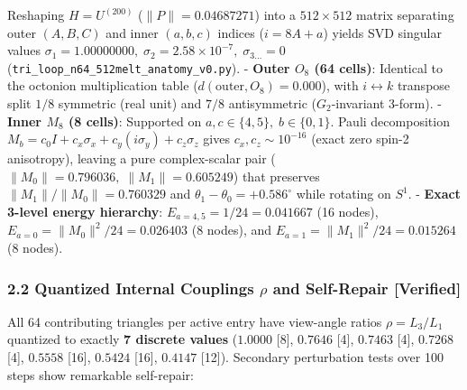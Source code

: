 \documentclass[
  a4paper,
]{article}
\begin{document}
Reshaping \(H = U^{(200)}\) (\(\|P\| = 0.04687271\)) into a
\(512\times 512\) matrix separating outer \((A,B,C)\) and inner
\((a,b,c)\) indices (\(i = 8A+a\)) yields SVD singular values
\(\sigma_1 = 1.00000000,\; \sigma_2 = 2.58\times 10^{-7},\; \sigma_{3\dots} = 0\)
(\texttt{tri\_\allowbreak{}loop\_\allowbreak{}n64\_\allowbreak{}512melt\_\allowbreak{}anatomy\_\allowbreak{}v0.py}). - \textbf{Outer
\(O_8\) (64 cells)}: Identical to the octonion multiplication table
(\(d(\text{outer}, O_8) = 0.000\)), with \(i \leftrightarrow k\)
transpose split \(1/8\) symmetric (real unit) and \(7/8\) antisymmetric
(\(G_2\)-invariant 3-form). - \textbf{Inner \(M_8\) (8 cells)}:
Supported on \(a,c \in \{4,5\},\; b \in \{0,1\}\). Pauli decomposition
\(M_b = c_0 I + c_x \sigma_x + c_y(i\sigma_y) + c_z \sigma_z\) gives
\(c_x, c_z \sim 10^{-16}\) (exact zero spin-2 anisotropy), leaving a
pure complex-scalar pair (\(\|M_0\| = 0.796036,\; \|M_1\| = 0.605249\))
that preserves \(\|M_1\|/\|M_0\| = 0.760329\) and
\(\theta_1 - \theta_0 = +0.586^\circ\) while rotating on \(S^1\). -
\textbf{Exact 3-level energy hierarchy}: \(E_{a=4,5} = 1/24 = 0.041667\)
(16 nodes), \(E_{a=0} = \|M_0\|^2/24 = 0.026403\) (8 nodes), and
\(E_{a=1} = \|M_1\|^2/24 = 0.015264\) (8 nodes).

\subsubsection{\texorpdfstring{2.2 Quantized Internal Couplings \(\rho\)
and Self-Repair
{[}Verified{]}}{2.2 Quantized Internal Couplings \textbackslash rho and Self-Repair {[}Verified{]}}}\label{quantized-internal-couplings-rho-and-self-repair-verified}

All 64 contributing triangles per active entry have view-angle ratios
\(\rho = L_3/L_1\) quantized to exactly \textbf{7 discrete values}
(\(1.0000\) {[}8{]}, \(0.7646\) {[}4{]}, \(0.7463\) {[}4{]}, \(0.7268\)
{[}4{]}, \(0.5558\) {[}16{]}, \(0.5424\) {[}16{]}, \(0.4147\) {[}12{]}).
Secondary perturbation tests over 100 steps show remarkable self-repair:
\end{document}
